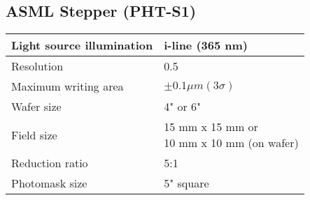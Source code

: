 \subsection{ASML Stepper (PHT-S1)}\label{lithography_machine}
\WaferClean\WaferSemiClean

	\begin{tabular}{|p{5cm}|p{7cm}|}
		\hline
		Light source illumination &
		i-line (365 nm) \\
		\hline
		Resolution &
		0.5\um \\
		\hline
		Maximum writing area &
		$\pm 0.1 \mu m (3 \sigma)$ \\
		\hline
		Wafer size &
		4" or 6" \\
		\hline
		Field size &
		\makecell[l]{
			15 mm x 15 mm or \\
			10 mm x 10 mm (on wafer)
		} \\
		\hline
		Reduction ratio &
		5:1 \\
		\hline
		Photomask size &
		5" square \\
		\hline
	\end{tabular}